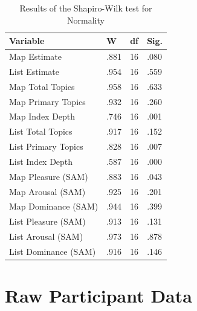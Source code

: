 \begin{table}[htbp!]
\centering
\caption{Results of the Shapiro-Wilk test for Normality}\vspace{0.3cm}
\label{res:sw}
\begin{tabular}{|llll|}
\hline
Variable                             & W    & df & Sig. \\ \hline\hline
Map Estimate                         & .881 & 16 & .080 \\
List Estimate                        & .954 & 16 & .559 \\
Map Total Topics                     & .958 & 16 & .633 \\
Map Primary Topics                   & .932 & 16 & .260 \\
Map Index Depth                      & .746 & 16 & .001 \\
List Total Topics                    & .917 & 16 & .152 \\
List Primary Topics                  & .828 & 16 & .007 \\
List Index Depth                     & .587 & 16 & .000 \\
Map Pleasure (SAM)                   & .883 & 16 & .043 \\
Map Arousal (SAM)                    & .925 & 16 & .201 \\
Map Dominance (SAM)                  & .944 & 16 & .399 \\
List Pleasure (SAM)                  & .913 & 16 & .131 \\
List Arousal (SAM)                   & .973 & 16 & .878 \\
List Dominance (SAM)                 & .916 & 16 & .146 \\
\hline
\end{tabular}
\end{table}
\vspace{1cm}

\section{Raw Participant Data} \label{sec:evalraw}


